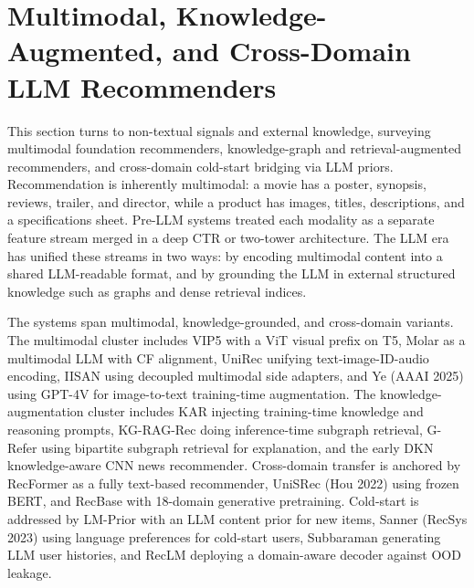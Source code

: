 \documentclass{article}
\begin{document}
\section{Multimodal, Knowledge-Augmented, and Cross-Domain LLM Recommenders}\label{multimodal-knowledge-augmented-and-cross-domain-llm-recommenders}

This section turns to non-textual signals and external knowledge, surveying multimodal foundation recommenders, knowledge-graph and retrieval-augmented recommenders, and cross-domain cold-start bridging via LLM priors. Recommendation is inherently multimodal: a movie has a poster, synopsis, reviews, trailer, and director, while a product has images, titles, descriptions, and a specifications sheet. Pre-LLM systems treated each modality as a separate feature stream merged in a deep CTR or two-tower architecture. The LLM era has unified these streams in two ways: by encoding multimodal content into a shared LLM-readable format, and by grounding the LLM in external structured knowledge such as graphs and dense retrieval indices.

The systems span multimodal, knowledge-grounded, and cross-domain variants. The multimodal cluster includes VIP5 \citep{geng2023vip5towardsmultimo} with a ViT visual prefix on T5, Molar \citep{luo2024recrankerinstructi} as a multimodal LLM with CF alignment, UniRec \citep{lei2026unirecunifiedmulti} unifying text-image-ID-audio encoding, IISAN \citep{fu2024iisanefficientlyad} using decoupled multimodal side adapters, and Ye (AAAI 2025) using GPT-4V for image-to-text training-time augmentation. The knowledge-augmentation cluster includes KAR \citep{xi2024towardsopenworldre} injecting training-time knowledge and reasoning prompts, KG-RAG-Rec \citep{wang2025knowledgegraphretr} doing inference-time subgraph retrieval, G-Refer \citep{li2025grefergraphretriev} using bipartite subgraph retrieval for explanation, and the early DKN \citep{wang2018www2018} knowledge-aware CNN news recommender. Cross-domain transfer is anchored by RecFormer \citep{li2023textisallyouneedle} as a fully text-based recommender, UniSRec (Hou 2022) using frozen BERT, and RecBase \citep{zhou2025recbasegenerativef} with 18-domain generative pretraining. Cold-start is addressed by LM-Prior \citep{wang2024recmindlargelangua} with an LLM content prior for new items, Sanner (RecSys 2023) using language preferences for cold-start users, Subbaraman \citet{subbaraman2025selectinguserhisto} generating LLM user histories, and RecLM \citep{liao2025eliminatingoutofdo} deploying a domain-aware decoder against OOD leakage.
\end{document}

